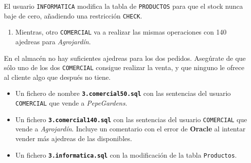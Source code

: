 \begin{homeworkProblem}


  El usuario \texttt{INFORMATICA} modifica la tabla de \texttt{PRODUCTOS} para que el stock nunca baje de cero, añadiendo una restricción \texttt{CHECK}.
  
  {

    \begin{enumerate}
    \item Mientras, otro \texttt{COMERCIAL} va a realizar las mismas operaciones con 140 ajedreas para \textit{Agrojardín}.
    \end{enumerate}
  }
  En el almacén no hay suficientes ajedreas para los dos pedidos. Asegúrate de que sólo uno de los dos \texttt{COMERCIAL} consigue realizar la venta, y que ninguno le ofrece al cliente algo que después no tiene.
  

  \begin{Aviso}

    \begin{itemize}
    \item Un fichero de nombre \textbf{\texttt{3.comercial50.sql}} con las sentencias del usuario \texttt{COMERCIAL} que vende a \textit{PepeGardens}.
    \item Un fichero \textbf{\texttt{3.comercial140.sql}} con las sentencias del usuario \texttt{COMERCIAL} que vende a \textit{Agrojardín}. Incluye un comentario con el error de \textbf{Oracle} al intentar vender más ajedreas de las disponibles.
    \item Un fichero \textbf{\texttt{3.informatica.sql}} con la modificación de la tabla \texttt{Productos}.
    \end{itemize}
    

  \end{Aviso}

\end{homeworkProblem}


